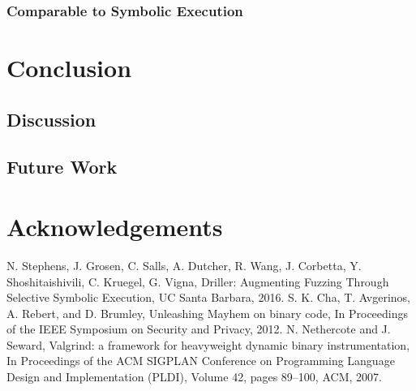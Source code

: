 \documentclass[a4paper]{article}
\begin{document}
\subsubsection*{Comparable to Symbolic Execution}
\section{Conclusion}
\label{sec:Conclusion}

\subsection{Discussion}
\label{sec:Discussion}

\subsection{Future Work}
\label{sec:FutureWork}
\section{Acknowledgements}
\label{sec:Acks}
\begin{thebibliography}{9}
	N. Stephens, J. Grosen, C. Salls, A. Dutcher, R. Wang, J. Corbetta, Y. Shoshitaishivili, C. Kruegel, G.  Vigna,
	Driller: Augmenting Fuzzing Through Selective Symbolic Execution,
	UC Santa Barbara,
	2016.
	S. K. Cha, T. Avgerinos, A. Rebert, and D. Brumley,
	Unleashing Mayhem on binary code,
	In Proceedings of the IEEE Symposium on Security and Privacy,
	2012.
	N. Nethercote and J. Seward,
	Valgrind: a framework for heavyweight dynamic binary instrumentation, 
	In Proceedings of the ACM SIGPLAN Conference on Programming Language Design and Implementation (PLDI),
	Volume 42,
	pages 89–100, 
	ACM,
	2007.
\end{thebibliography}

\end{document}
